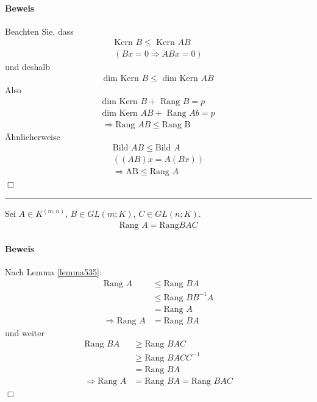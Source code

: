 \documentclass[11pt]{report}
\begin{document}
\paragraph{Beweis}
Beachten Sie, dass 
\begin{align}
\text{Kern } B \leq \text{ Kern } AB \\
(Bx = 0 \Rightarrow ABx = 0)
\end{align}
und deshalb
\begin{align}
\text{dim Kern } B \leq \text{ dim Kern } AB
\end{align}
Also
\begin{align}
\text{dim Kern } B + \text{ Rang } B = p \\
\text{dim Kern } AB + \text{ Rang } Ab = p \\
\Rightarrow \text{Rang } AB \leq \text{Rang B}
\end{align}
Ähnlicherweise 
\begin{align}
\text{Bild } AB \leq \text{Bild } A \\
((AB)x = A(Bx)) \\
\Rightarrow \text{AB} \leq \text{Rang } A
\end{align}
\hspace*{1cm} \hfill $\Box$
\vspace*{0.1cm}\rule{\linewidth}{0.3mm}\vspace{0.1cm}
\begin{satz}
\label{satz536}
Sei $A \in K^{(m,n)}$, $B \in GL(m;K)$, $C \in GL(n;K)$.
\begin{align}
\text{Rang } A = \text{Rang} BAC
\end{align}
\end{satz}
\paragraph{Beweis}
Nach Lemma \ref{lemma535}:
\begin{align}
\text{Rang } A &\leq \text{Rang } BA \\
&\leq \text{Rang } BB^{-1} A \\
&= \text{Rang } A \\
\Rightarrow \text{Rang } A &= \text{Rang } BA
\end{align}
und weiter
\begin{align}
\text{Rang } BA &\geq \text{Rang } BAC \\
&\geq \text{Rang } BACC^{-1} \\ &= \text{Rang } BA \\
\Rightarrow \text{Rang } A &= \text{Rang } BA = \text{Rang } BAC
\end{align} \hfill $\Box$ \\
\end{document}
